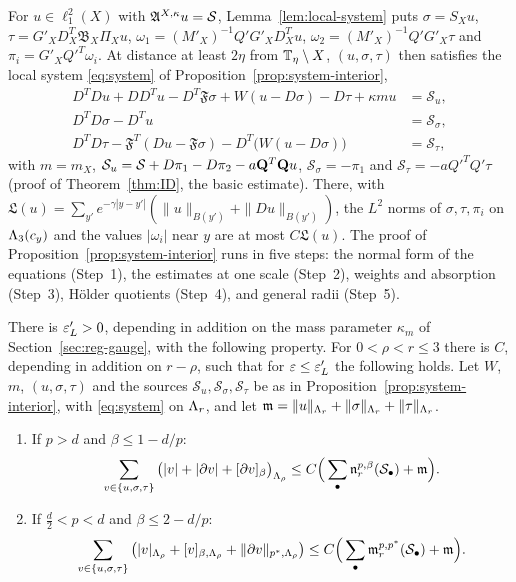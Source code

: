 \begin{readingbox}
For $u\in\ell^2_1(X)$ with $\mathfrak A^{X,\kappa}u=\mathcal S$, Lemma~\ref{lem:local-system} puts $\sigma=S_Xu$, $\tau=G'_XD^T_X\mathfrak B_X\Pi_Xu$, $\omega_1=(M'_X)^{-1}Q'G'_XD^T_Xu$, $\omega_2=(M'_X)^{-1}Q'G'_X\tau$ and $\pi_i=G'_XQ'^T\omega_i$. At distance at least $2\eta$ from $\mathbb T_\eta\setminus X$, $(u,\sigma,\tau)$ then satisfies the local system \eqref{eq:system} of Proposition~\ref{prop:system-interior},
\[
\begin{aligned}
D^TDu+DD^Tu-D^T\mathfrak F\sigma+W(u-D\sigma)-D\tau+\kappa mu&=\mathcal S_u,\\
D^TD\sigma-D^Tu&=\mathcal S_\sigma,\\
D^TD\tau-\mathfrak F^T(Du-\mathfrak F\sigma)-D^T\big(W(u-D\sigma)\big)&=\mathcal S_\tau,
\end{aligned}
\]
with $m=m_X$, $\mathcal S_u=\mathcal S+D\pi_1-D\pi_2-a\mathbf Q^T\mathbf Q u$, $\mathcal S_\sigma=-\pi_1$ and $\mathcal S_\tau=-aQ'^TQ'\tau$ (proof of Theorem~\ref{thm:ID}, the basic estimate). There, with $\mathfrak L(u)=\sum_{y'}e^{-\gamma|y-y'|}(\|u\|_{B(y')}+\|Du\|_{B(y')})$, the $L^2$ norms of $\sigma,\tau,\pi_i$ on $\Lambda_3(c_y)$ and the values $|\omega_i|$ near $y$ are at most $C\mathfrak L(u)$. The proof of Proposition~\ref{prop:system-interior} runs in five steps: the normal form of the equations (Step~1), the estimates at one scale (Step~2), weights and absorption (Step~3), H\"older quotients (Step~4), and general radii (Step~5).
\end{readingbox}

\begin{proposition}\label{prop:system-lp}
There is $\varepsilon_L'>0$, depending in addition on the mass parameter $\kappa_m$ of Section~\ref{sec:reg-gauge}, with the following property. For $0<\rho<r\le3$ there is $C$, depending in addition on $r-\rho$, such that for $\varepsilon\le\varepsilon_L'$ the following holds. Let $W$, $m$, $(u,\sigma,\tau)$ and the sources $\mathcal S_u,\mathcal S_\sigma,\mathcal S_\tau$ be as in Proposition~\ref{prop:system-interior}, with \eqref{eq:system} on $\Lambda_r$, and let $\mathfrak m=\|u\|_{\Lambda_r}+\|\sigma\|_{\Lambda_r}+\|\tau\|_{\Lambda_r}$.
\begin{enumerate}[label=(\alph*)]
\item If $p>d$ and $\beta\le1-d/p$:
\[
\sum_{v\in\{u,\sigma,\tau\}}\big(|v|+|\partial v|+[\partial v]_\beta\big)_{\Lambda_\rho}\le C\Big(\sum_\bullet\mathfrak n^{p,\beta}_r(\mathcal S_\bullet)+\mathfrak m\Big).
\]
\item If $\frac d2<p<d$ and $\beta\le2-d/p$:
\[
\sum_{v\in\{u,\sigma,\tau\}}\big(|v|_{\Lambda_\rho}+[v]_{\beta,\Lambda_\rho}+\|\partial v\|_{p^*,\Lambda_\rho}\big)\le C\Big(\sum_\bullet\mathfrak m^{p,p^*}_r(\mathcal S_\bullet)+\mathfrak m\Big).
\]
\end{enumerate}
\end{proposition}

